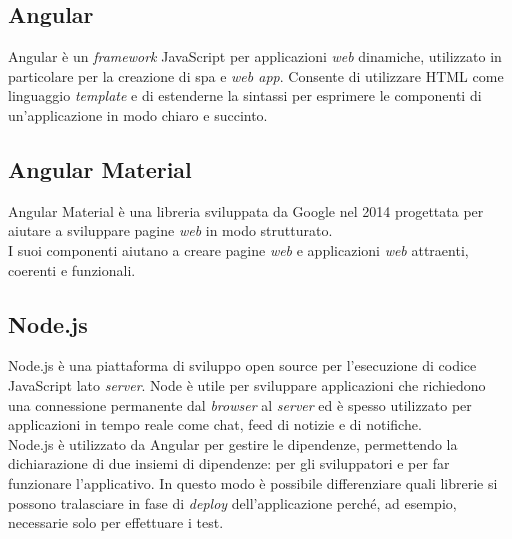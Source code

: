 \subsection*{Angular}
Angular è un \textit{framework} JavaScript per applicazioni \textit{web} dinamiche, utilizzato in particolare per la creazione di \gls{spa} e \textit{web app}. Consente di utilizzare HTML come linguaggio \textit{template} e di estenderne la sintassi per esprimere le componenti di un'applicazione in modo chiaro e succinto.

\subsection*{Angular Material}
Angular Material è una libreria sviluppata da Google nel 2014 progettata per aiutare a sviluppare pagine \textit{web} in modo strutturato. \\
I suoi componenti aiutano a creare pagine \textit{web} e applicazioni \textit{web} attraenti, coerenti e funzionali.

\subsection*{Node.js}
Node.js è una piattaforma di sviluppo open source per l'esecuzione di codice JavaScript lato \textit{server}. Node è utile per sviluppare applicazioni che richiedono una connessione permanente dal \textit{browser} al \textit{server} ed è spesso utilizzato per applicazioni in tempo reale come chat, feed di notizie e di notifiche.\\
Node.js è utilizzato da Angular per gestire le dipendenze, permettendo la dichiarazione di due insiemi di dipendenze: per gli sviluppatori e per far funzionare l'applicativo. In questo modo è possibile differenziare quali librerie si possono tralasciare in fase di \textit{deploy} dell'applicazione perché, ad esempio, necessarie solo per effettuare i test.

